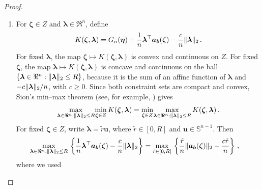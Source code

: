 \documentclass{article}
\makeatletter
\theoremstyle{definition}
\newcommand{\vnorm}[1]{%
	\ensuremath{%
		\if@display
		\left\| #1 \right\|
		\else
		\| #1 \|
		\fi
	}%
}
\newcommand*{\bb}{\boldsymbol}
\def\bw {\bb{w}}
\def\bu{\bb{u}}
\def\blambda{\bb{\lambda}}
\makeatother
\begin{document}
\begin{bibunit}
\begin{proof}
\begin{enumerate}[label=(\roman*)]
	The map in \eqref{eq:psi_conv_conc_po_map} is affine in $\bw$ for
	fixed $\blambda$. For fixed $\bw$, it is the sum of an affine function
	of $\blambda$ and the concave function $\psi(\blambda)$, and hence is
	concave in $\blambda$. Continuity follows from continuity of the
	bilinear term and continuity of $\psi$. If $S_{\bw}$ is convex, its
	affine dependence on $\bw$ gives the stated convex--concave property.

	\item For $\bb\zeta\in Z$ and $\blambda\in\Re^n$, define
	\begin{equation}
		\label{eq:psi_conv_conc_K_def}
		K(\bb\zeta,\blambda)
		=
		G_n(\bb\eta)
		+
		\frac{1}{n}
		\blambda^\top
		\bb a_{\bb b}(\bb\zeta)
		-
		\frac{c}{n}
		\vnorm{\blambda}_2 \,.
	\end{equation}
	For fixed $\blambda$, the map $\bb\zeta\mapsto K(\bb\zeta,\blambda)$ is convex and continuous on $Z$. For fixed $\bb\zeta$, the map $\blambda\mapsto K(\bb\zeta,\blambda)$ is concave and continuous on the ball $\{\blambda\in\Re^n:\vnorm{\blambda}_2\leq R\}$, because it is the sum of an affine function of $\blambda$ and $-c\vnorm{\blambda}_2/n$, with $c\geq0$. Since both constraint sets are compact and convex, Sion's min--max theorem (see, for example, \citealt[][Theorem~3]{simons:1995}) gives
	\begin{equation}
		\label{eq:psi_conv_conc_first_sion}
		\underset{\blambda\in\Re^n:\vnorm{\blambda}_2\leq R}{\max}
		\underset{\bb\zeta\in Z}{\min} \,
		K(\bb\zeta,\blambda)
		=
		\underset{\bb\zeta\in Z}{\min}
		\underset{\blambda\in\Re^n:\vnorm{\blambda}_2\leq R}{\max} \,
		K(\bb\zeta,\blambda) \,.
	\end{equation}
	For fixed $\bb\zeta\in Z$, write $\blambda=\tilde r\bu$, where $\tilde r\in[0,R]$ and $\bu\in\mathbb S^{n-1}$. Then
	\begin{equation}
		\label{eq:psi_conv_conc_support}
		\begin{aligned}
			&\underset{\blambda\in\Re^n:\vnorm{\blambda}_2\leq R}{\max} \,
			\left\{
				\frac{1}{n}
				\blambda^\top
				\bb a_{\bb b}(\bb\zeta)
				-
				\frac{c}{n}
				\vnorm{\blambda}_2
			\right\} 
			=
			\underset{\tilde r\in[0,R]}{\max} \,
			\left\{
				\frac{\tilde r}{n}
				\vnorm{
					\bb a_{\bb b}(\bb\zeta)
				}_2
				-
				\frac{c\tilde r}{n}
			\right\} \,,
		\end{aligned}
	\end{equation}
	where we used 
	\begin{equation}
		\label{eq:psi_conv_conc_support_identity}

\end{equation}
\end{enumerate}
\end{proof}
\end{bibunit}
\end{document}
